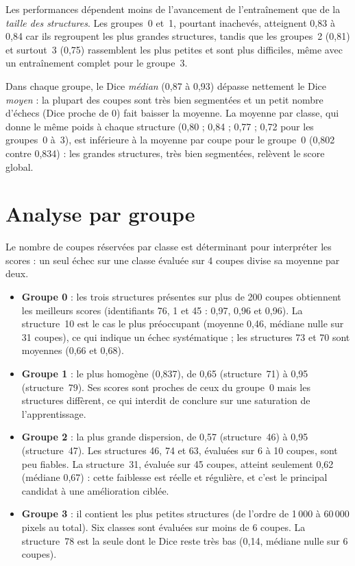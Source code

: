 \documentclass[12pt,a4paper]{report}
\begin{document}
Les performances dépendent moins de l'avancement de l'entraînement que de la \emph{taille des structures}. Les groupes~0 et~1, pourtant inachevés, atteignent 0,83 à 0,84 car ils regroupent les plus grandes structures, tandis que les groupes~2 (0,81) et surtout~3 (0,75) rassemblent les plus petites et sont plus difficiles, même avec un entraînement complet pour le groupe~3.

Dans chaque groupe, le Dice \emph{médian} (0,87 à 0,93) dépasse nettement le Dice \emph{moyen} : la plupart des coupes sont très bien segmentées et un petit nombre d'échecs (Dice proche de 0) fait baisser la moyenne. La moyenne par classe, qui donne le même poids à chaque structure (0,80 ; 0,84 ; 0,77 ; 0,72 pour les groupes~0 à~3), est inférieure à la moyenne par coupe pour le groupe~0 (0,802 contre 0,834) : les grandes structures, très bien segmentées, relèvent le score global.

\section{Analyse par groupe}

Le nombre de coupes réservées par classe est déterminant pour interpréter les scores : un seul échec sur une classe évaluée sur 4 coupes divise sa moyenne par deux.
\begin{itemize}
    \item \textbf{Groupe 0} : les trois structures présentes sur plus de 200 coupes obtiennent les meilleurs scores (identifiants 76, 1 et 45 : 0,97, 0,96 et 0,96). La structure~10 est le cas le plus préoccupant (moyenne 0,46, médiane nulle sur 31 coupes), ce qui indique un échec systématique ; les structures 73 et 70 sont moyennes (0,66 et 0,68).
    \item \textbf{Groupe 1} : le plus homogène (0,837), de 0,65 (structure~71) à 0,95 (structure~79). Ses scores sont proches de ceux du groupe~0 mais les structures diffèrent, ce qui interdit de conclure sur une saturation de l'apprentissage.
    \item \textbf{Groupe 2} : la plus grande dispersion, de 0,57 (structure~46) à 0,95 (structure~47). Les structures 46, 74 et 63, évaluées sur 6 à 10 coupes, sont peu fiables. La structure~31, évaluée sur 45 coupes, atteint seulement 0,62 (médiane 0,67) : cette faiblesse est réelle et régulière, et c'est le principal candidat à une amélioration ciblée.
    \item \textbf{Groupe 3} : il contient les plus petites structures (de l'ordre de 1\,000 à 60\,000 pixels au total). Six classes sont évaluées sur moins de 6 coupes. La structure~78 est la seule dont le Dice reste très bas (0,14, médiane nulle sur 6 coupes).
\end{itemize}
\end{document}
